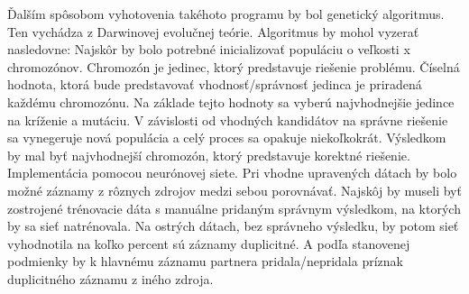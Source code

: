 \newline \newline
Ďalším spôsobom vyhotovenia takéhoto programu by bol genetický algoritmus. Ten vychádza z Darwinovej evolučnej teórie. Algoritmus by mohol vyzerať nasledovne: 
Najskôr by bolo potrebné inicializovať populáciu o veľkosti x chromozónov. Chromozón je jedinec, ktorý predstavuje riešenie problému. Číselná hodnota, ktorá bude predstavovať vhodnosť/správnosť jedinca je priradená každému chromozónu. Na základe tejto hodnoty sa vyberú najvhodnejšie jedince na kríženie a mutáciu. V závislosti od vhodných kandidátov na správne riešenie sa vynegeruje nová populácia  a celý proces sa opakuje niekoľkokrát. Výsledkom by mal byť najvhodnejší chromozón, ktorý predstavuje korektné riešenie.
\newline \newline
Implementácia pomocou neurónovej siete. 
Pri vhodne upravených dátach by bolo možné záznamy z rôznych zdrojov medzi sebou porovnávať.
Najskôj by museli byť zostrojené trénovacie dáta s manuálne pridaným správnym výsledkom, na ktorých by sa sieť natrénovala.
Na ostrých dátach, bez správneho výsledku, by potom sieť vyhodnotila na koľko percent sú záznamy duplicitné.
A podľa stanovenej podmienky by k hlavnému záznamu partnera pridala/nepridala príznak duplicitného záznamu z iného zdroja.


